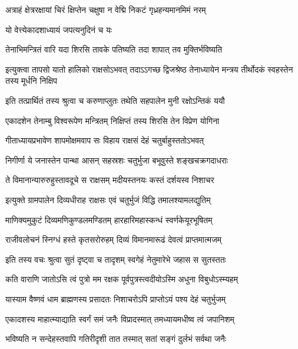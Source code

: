 \twolineshloka
{अत्राहं क्षेत्ररक्षायां चिरं क्षिप्तेन चक्षुषा}
{न वेद्मि निकटं गृध्रहन्यमानमिमं नरम्} %



\onelineshloka
{यो वेत्त्येकादशाध्यायं जपत्यनुदिनं च यः} %

\twolineshloka
{तेनाभिमन्त्रितं वारि यदा शिरसि तावके}
{पतिष्यति तदा शापात् तव मुक्तिर्भविष्यति} %

\threelineshloka
{इत्युक्त्वा तापसो यातो हालिको राक्षसोऽभवत्}
{तदाऽऽगच्छ द्विजश्रेष्ठ तेनाध्यायेन मन्त्रय}
{तीर्थोदकं स्वहस्तेन तस्य मूर्धनि निक्षिप} %


\twolineshloka
{इति तत्प्रार्थितं तस्य श्रुत्वा च करुणाप्लुतः}
{तथेति सहपालेन मुनी रक्षोऽन्तिकं ययौ} %

\twolineshloka
{एकादशेन तेनाम्बु विश्वरूपेण मन्त्रितम्}
{निक्षिप्तं तस्य शिरसि तेन विप्रेण योगिना} %

\twolineshloka
{गीताध्यायप्रभावेण शापमोक्षमवाप सः}
{विहाय राक्षसं देहं चतुर्बाहुस्ततोऽभवत्} %

\twolineshloka
{निगीर्णा ये जनास्तेन पान्था आसन् सहस्रशः}
{चतुर्भुजा बभूवुस्ते शङ्खचक्रगदाधराः} %

\twolineshloka
{ते विमानान्यारुरुहुस्तावदूचे स राक्षसम्}
{मदीयस्तनयः कस्तं दर्शयस्व निशाचर} %

\twolineshloka
{इत्युक्ते ग्रामपालेन दिव्यधीराह राक्षसः}
{एवं चतुर्भुजं विद्धि तमालश्यामलद्युतिम्} %

\twolineshloka
{माणिक्यमुकुटं दिव्यमणिकुण्डलमण्डितम्}
{हारहारिमहास्कन्धं स्वर्णकेयूरभूषितम्} %

\twolineshloka
{राजीवलोचनं स्निग्धं हस्ते कृतसरोरुहम्}
{दिव्यं विमानमारूढं देवत्वं प्राप्तमात्मजम्} %

\twolineshloka
{इति तस्य वचः श्रुत्वा सुतं दृष्ट्वा च तादृशम्}
{स्वगेहं नेतुमारेभे जहास स सुतस्ततः} %

\twolineshloka
{कति वाराणि जातोऽसि त्वं पुत्रो मम रक्षक}
{पूर्वपुत्रस्त्वदीयोऽस्मि अधुना विबुधोऽस्म्यहम्} %

\twolineshloka
{यास्याम वैष्णवं धाम ब्राह्मणस्य प्रसादतः}
{निशाचरोऽपि प्राप्तोऽयं पश्य देहं चतुर्भुजम्} %

\twolineshloka
{एकादशस्य माहात्म्याद्याति स्वर्गं समं जनैः}
{विप्रादस्मात् तमध्यायमधीष्व त्वं जपानिशम्} %

\twolineshloka
{भविष्यति न सन्देहस्तवापि गतिरीदृशी}
{तात तस्मात् सतां सङ्गं दुर्लभं सर्वथा जनैः} %


